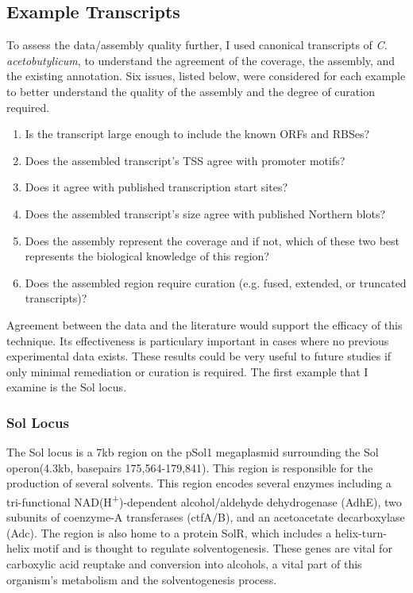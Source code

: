 



\subsection{Example Transcripts}


To assess the data/assembly quality further, I used canonical transcripts of \textit{C. acetobutylicum}, to understand the agreement of the coverage, the assembly, and the existing annotation. Six issues, listed below, were considered for each example to better understand the quality of the assembly and the degree of curation required. 

\begin{enumerate}
\item Is the transcript large enough to include the known ORFs and RBSes?
\item Does the assembled transcript's TSS agree with promoter motifs?
\item Does it agree with published transcription start sites?
\item Does the assembled transcript's size agree with published Northern blots?
\item Does the assembly represent the coverage and if not, which of these two best represents the biological knowledge of this region?
\item Does the assembled region require curation (e.g. fused, extended, or truncated transcripts)?
\end{enumerate}

Agreement between the data and the literature would support the efficacy of this technique. Its effectiveness is particulary important in cases where no previous experimental data exists. These results could be very useful to future studies if only minimal remediation or curation is required. The first example that I examine is the Sol locus.

\subsubsection{Sol Locus}

The Sol locus is a 7kb region on the pSol1 megaplasmid surrounding the Sol operon(4.3kb, basepairs 175,564-179,841). This region is responsible for the production of several solvents\cite{62,63}. This region encodes several enzymes including a tri-functional NAD(H\textsuperscript{+})-dependent alcohol/aldehyde dehydrogenase (AdhE)\cite{62}, two subunits of coenzyme-A transferases (ctfA/B)\cite{66}, and an acetoacetate decarboxylase (Adc)\cite{64,65,66}. The region is also home to a protein SolR, which includes a helix-turn-helix motif and is thought to regulate solventogenesis\cite{67}. These genes are vital for carboxylic acid reuptake and conversion into alcohols, a vital part of this organism's metabolism and the solventogenesis process.

